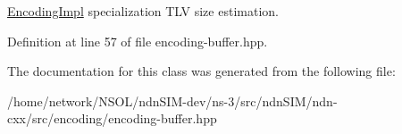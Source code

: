 \hyperlink{classndn_1_1encoding_1_1EncodingImpl}{Encoding\+Impl} specialization T\+LV size estimation. 

Definition at line 57 of file encoding-\/buffer.\+hpp.



The documentation for this class was generated from the following file\+:\begin{DoxyCompactItemize}
\item 
/home/network/\+N\+S\+O\+L/ndn\+S\+I\+M-\/dev/ns-\/3/src/ndn\+S\+I\+M/ndn-\/cxx/src/encoding/encoding-\/buffer.\+hpp\end{DoxyCompactItemize}
